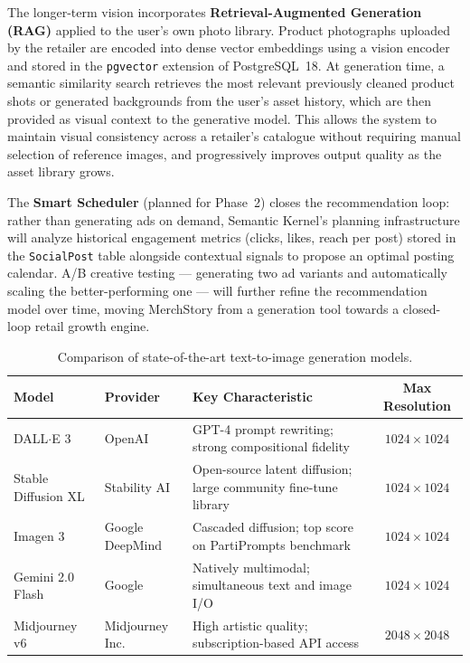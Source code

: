 \documentclass[12pt, a4paper]{report}
\begin{document}
\medskip\noindent
The longer-term vision incorporates \textbf{Retrieval-Augmented Generation
(RAG)} applied to the user's own photo library.  Product photographs uploaded
by the retailer are encoded into dense vector embeddings using a vision
encoder and stored in the \texttt{pgvector} extension of PostgreSQL~18.
At generation time, a semantic similarity search retrieves the most relevant
previously cleaned product shots or generated backgrounds from the user's
asset history, which are then provided as visual context to the generative
model.  This allows the system to maintain visual consistency across a
retailer's catalogue without requiring manual selection of reference images,
and progressively improves output quality as the asset library grows.

\medskip\noindent
The \textbf{Smart Scheduler} (planned for Phase~2) closes the recommendation
loop: rather than generating ads on demand, Semantic Kernel's planning
infrastructure will analyze historical engagement metrics (clicks, likes,
reach per post) stored in the \texttt{SocialPost} table alongside contextual
signals to propose an optimal posting calendar.  A/B creative testing ---
generating two ad variants and automatically scaling the better-performing
one --- will further refine the recommendation model over time, moving
MerchStory from a generation tool towards a closed-loop retail growth engine.

\begin{table}[H]
  \centering
  \caption{Comparison of state-of-the-art text-to-image generation models.}
  \label{tab:model-comparison}
  \begin{tabular}{@{} l >{\raggedright\arraybackslash}p{2.8cm} >{\raggedright\arraybackslash}p{6.2cm} c @{}}
    \toprule
    \textbf{Model}        & \textbf{Provider}   & \textbf{Key Characteristic}        & \textbf{Max Resolution} \\
    \midrule
    DALL$\cdot$E 3        & OpenAI              & GPT-4 prompt rewriting; strong compositional fidelity            & $1024{\times}1024$ \\[3pt]
    Stable Diffusion XL   & Stability AI        & Open-source latent diffusion; large community fine-tune library  & $1024{\times}1024$ \\[3pt]
    Imagen 3              & Google DeepMind     & Cascaded diffusion; top score on PartiPrompts benchmark          & $1024{\times}1024$ \\[3pt]
    Gemini 2.0 Flash      & Google              & Natively multimodal; simultaneous text and image I/O             & $1024{\times}1024$ \\[3pt]
    Midjourney v6         & Midjourney Inc.     & High artistic quality; subscription-based API access             & $2048{\times}2048$ \\
    \bottomrule
  \end{tabular}
\end{table}
\end{document}
